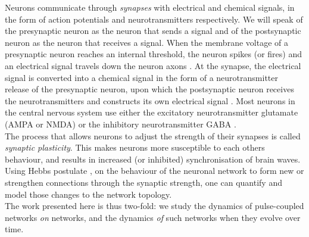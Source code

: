 Neurons communicate through \textsl{synapses} with electrical and chemical signals, in the form of action potentials and neurotransmitters respectively. We will speak of the presynaptic neuron as the neuron that sends a signal and of the postsynaptic neuron as the neuron that receives a signal. When the membrane voltage of a presynaptic neuron reaches an internal threshold, the neuron spikes (or fires) and an electrical signal travels down the neuron axons \cite{IntroductionModelingDynamics}. At the synapse, the electrical signal is converted into a chemical signal in the form of a neurotransmitter release of the presynaptic neuron, upon which the postsynaptic neuron receives the neurotransmitters and constructs its own electrical signal \cite{ActionPotentialsAndSynapses}. Most neurons in the central nervous system use either the excitatory neurotransmitter glutamate (AMPA or NMDA) or the inhibitory neurotransmitter GABA \cite{MathFoundationNeuroscience, Zhang2012}. \\


The process that allows neurons to adjust the strength of their synapses is called \textsl{synaptic plasticity}. This makes neurons more susceptible to each others behaviour, and results in increased (or inhibited) synchronisation of brain waves. Using Hebbs postulate \cite{Hebb1949}, on the behaviour of the neuronal network to form new or strengthen connections through the synaptic strength, one can quantify and model those changes to the network topology. \\

The work presented here is thus two-fold:  we study the dynamics of pulse-coupled networks \textsl{on} networks, and the dynamics \textsl{of} such networks when they evolve over time. 